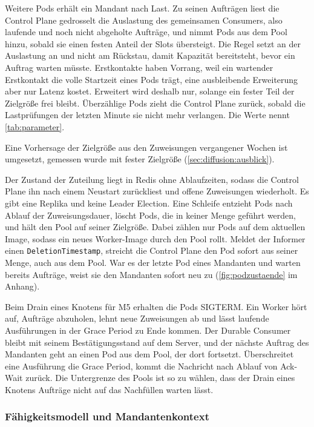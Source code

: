 Weitere Pods erhält ein Mandant nach Last. Zu seinen Aufträgen liest die Control Plane gedrosselt die Auslastung
des gemeinsamen Consumers, also laufende und noch nicht abgeholte Aufträge, und nimmt Pods aus dem Pool hinzu, sobald
sie einen festen Anteil der Slots übersteigt. Die Regel setzt an der Auslastung an und nicht am Rückstau, damit
Kapazität bereitsteht, bevor ein Auftrag warten müsste. Erstkontakte haben Vorrang, weil ein wartender Erstkontakt die
volle Startzeit eines Pods trägt, eine ausbleibende Erweiterung aber nur Latenz kostet. Erweitert wird deshalb
nur, solange ein fester Teil der Zielgröße frei bleibt. Überzählige Pods zieht die Control Plane zurück, sobald die
Lastprüfungen der letzten Minute sie nicht mehr verlangen. Die Werte nennt \autoref{tab:parameter}.

Eine Vorhersage der Zielgröße aus den Zuweisungen vergangener Wochen ist umgesetzt, gemessen wurde mit fester
Zielgröße (\autoref{sec:diffusion:ausblick}).

Der Zustand der Zuteilung liegt in Redis ohne Ablaufzeiten, sodass die Control Plane ihn nach einem Neustart
zurückliest und offene Zuweisungen wiederholt. Es gibt eine Replika und keine Leader Election. Eine Schleife entzieht Pods
nach Ablauf der Zuweisungsdauer, löscht Pods, die in keiner Menge geführt werden, und hält den Pool auf seiner
Zielgröße. Dabei zählen nur Pods auf dem aktuellen Image, sodass ein neues Worker-Image durch den Pool rollt. Meldet
der Informer einen \texttt{DeletionTimestamp}, streicht die Control Plane den Pod sofort aus seiner Menge, auch aus dem Pool.
War es der letzte Pod eines Mandanten und warten bereits Aufträge, weist sie den Mandanten sofort neu zu
(\autoref{fig:podzustaende} im Anhang).

Beim Drain eines Knotens für M5 erhalten die Pods SIGTERM. Ein Worker hört auf, Aufträge abzuholen, lehnt neue
Zuweisungen ab und lässt laufende Ausführungen in der Grace Period zu Ende kommen. Der Durable Consumer bleibt mit seinem
Bestätigungsstand auf dem Server, und der nächste Auftrag des Mandanten geht an einen Pod aus dem Pool, der dort
fortsetzt. Überschreitet eine Ausführung die Grace Period, kommt die Nachricht nach Ablauf von Ack-Wait zurück. Die
Untergrenze des Pools ist so zu wählen, dass der Drain eines Knotens Aufträge nicht auf das Nachfüllen warten lässt.

\subsubsection{Fähigkeitsmodell und Mandantenkontext}
\label{sec:faehigkeitsmodell}

